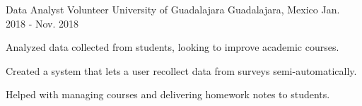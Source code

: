 \begin{cventries}
  \cventry
    {Data Analyst Volunteer} %
    {University of Guadalajara} %
    {Guadalajara, Mexico} %
    {Jan. 2018 - Nov. 2018} %
    {
      \begin{cvitems} %
        \item {Analyzed data collected from students, looking to improve academic courses.}
        \item {Created a system that lets a user recollect data from surveys semi-automatically.}
        \item {Helped with managing courses and delivering homework notes to students.}
      \end{cvitems}
    }

\end{cventries}
